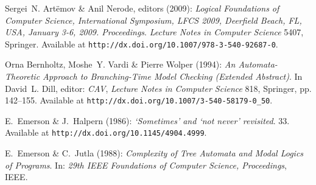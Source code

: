 \documentclass[submission,copyright,creativecommons]{eptcs}
\begin{document}

\begin{thebibliography}{10}
\providecommand{\bibitemdeclare}[2]{}
\providecommand{\surnamestart}{}
\providecommand{\surnameend}{}
\providecommand{\urlprefix}{Available at }
\providecommand{\url}[1]{\texttt{#1}}
\providecommand{\href}[2]{\texttt{#2}}
\providecommand{\urlalt}[2]{\href{#1}{#2}}
\providecommand{\doi}[1]{doi:\urlalt{http://dx.doi.org/#1}{#1}}
\providecommand{\bibinfo}[2]{#2}

\bibitemdeclare{proceedings}{DBLP:conf/lfcs/2009}
\bibinfo{editor}{Sergei~N. \surnamestart Art{\"e}mov\surnameend} \&
  \bibinfo{editor}{Anil \surnamestart Nerode\surnameend}, editors
  (\bibinfo{year}{2009}): \emph{\bibinfo{title}{Logical Foundations of Computer
  Science, International Symposium, LFCS 2009, Deerfield Beach, FL, USA,
  January 3-6, 2009. Proceedings}}. {\sl \bibinfo{series}{Lecture Notes in
  Computer Science}} \bibinfo{volume}{5407}, \bibinfo{publisher}{Springer}.
\newblock \urlprefix\url{http://dx.doi.org/10.1007/978-3-540-92687-0}.

\bibitemdeclare{inproceedings}{DBLP:conf/cav/BernholtzVW94}
\bibinfo{author}{Orna \surnamestart Bernholtz\surnameend},
  \bibinfo{author}{Moshe~Y. \surnamestart Vardi\surnameend} \&
  \bibinfo{author}{Pierre \surnamestart Wolper\surnameend}
  (\bibinfo{year}{1994}): \emph{\bibinfo{title}{An Automata-Theoretic Approach
  to Branching-Time Model Checking (Extended Abstract)}}.
\newblock In \bibinfo{editor}{David~L. \surnamestart Dill\surnameend}, editor:
  {\sl \bibinfo{booktitle}{CAV}}, {\sl \bibinfo{series}{Lecture Notes in
  Computer Science}} \bibinfo{volume}{818}, \bibinfo{publisher}{Springer}, pp.
  \bibinfo{pages}{142--155}.
\newblock \urlprefix\url{http://dx.doi.org/10.1007/3-540-58179-0_50}.

\bibitemdeclare{article}{+emhal86}
\bibinfo{author}{E.~\surnamestart Emerson\surnameend} \&
  \bibinfo{author}{J.~\surnamestart Halpern\surnameend} (\bibinfo{year}{1986}):
  \emph{\bibinfo{title}{`{S}ometimes' and `not never' revisited}}.
\newblock {\sl \bibinfo{journal}{J. ACM}} \bibinfo{volume}{33}.
\newblock \urlprefix\url{http://dx.doi.org/10.1145/4904.4999}.

\bibitemdeclare{inproceedings}{EJ88}
\bibinfo{author}{E.~\surnamestart Emerson\surnameend} \&
  \bibinfo{author}{C.~\surnamestart Jutla\surnameend} (\bibinfo{year}{1988}):
  \emph{\bibinfo{title}{Complexity of Tree Automata and Modal Logics of
  Programs}}.
\newblock In: {\sl \bibinfo{booktitle}{29th IEEE Foundations of Computer
  Science, Proceedings}}, \bibinfo{publisher}{IEEE}.



\end{thebibliography}
\end{document}
